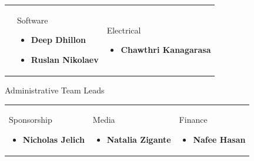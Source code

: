 \documentclass[main.tex]{subfiles}
\begin{document}
\begin{flushleft}
\begin{tabularx}{\linewidth}{@{}XXX@{}}
    &
    \begin{center}\large{Software}\end{center}
    \begin{itemize}[label={},noitemsep]
    \item \textbf{Deep Dhillon}
    \item \textbf{Ruslan Nikolaev}
    \end{itemize}
    &
    \begin{center}\large{Electrical}\end{center}
    \begin{itemize}[label={},noitemsep]
    \item \textbf{Chawthri Kanagarasa}
    \end{itemize}
\end{tabularx}
\begin{center}\large{Administrative Team Leads}\end{center}
\begin{tabularx}{\linewidth}{@{}XXX@{}}
    \begin{center}\large{Sponsorship}\end{center}
    \begin{itemize}[label={},noitemsep]
    \item \textbf{Nicholas Jelich}
    \end{itemize}
    &
    \begin{center}\large{Media}\end{center}
    \begin{itemize}[label={},noitemsep]
    \item \textbf{Natalia Zigante}
    \end{itemize}
    &
    \begin{center}\large{Finance}\end{center}
    \begin{itemize}[label={},noitemsep]
    \item \textbf{Nafee Hasan}
    \end{itemize}
\end{tabularx}
\end{flushleft}
\end{document}
